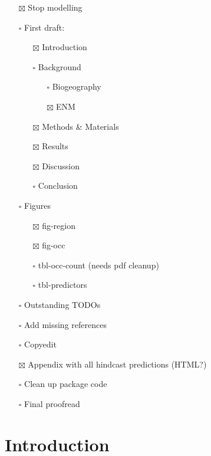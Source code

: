 \documentclass[
  authoryear,
  preprint]{elsarticle}
\providecommand{\tightlist}{%
  \setlength{\itemsep}{0pt}\setlength{\parskip}{0pt}}\usepackage{longtable,booktabs,array}
\begin{document}
\begin{itemize}
\tightlist
\item[$\boxtimes$]
  Stop modelling
\item[$\square$]
  First draft:

  \begin{itemize}
  \tightlist
  \item[$\boxtimes$]
    Introduction
  \item[$\square$]
    Background

    \begin{itemize}
    \tightlist
    \item[$\square$]
      Biogeography
    \item[$\boxtimes$]
      ENM
    \end{itemize}
  \item[$\boxtimes$]
    Methods \& Materials
  \item[$\boxtimes$]
    Results
  \item[$\boxtimes$]
    Discussion
  \item[$\square$]
    Conclusion
  \end{itemize}
\item[$\square$]
  Figures

  \begin{itemize}
  \tightlist
  \item[$\boxtimes$]
    fig-region
  \item[$\boxtimes$]
    fig-occ
  \item[$\square$]
    tbl-occ-count (needs pdf cleanup)
  \item[$\square$]
    tbl-predictors
  \end{itemize}
\item[$\square$]
  Outstanding TODOs
\item[$\square$]
  Add missing references
\item[$\square$]
  Copyedit
\item[$\boxtimes$]
  Appendix with all hindcast predictions (HTML?)
\item[$\square$]
  Clean up package code
\item[$\square$]
  Final proofread
\end{itemize}

\section{Introduction}\label{introduction}
\end{document}
